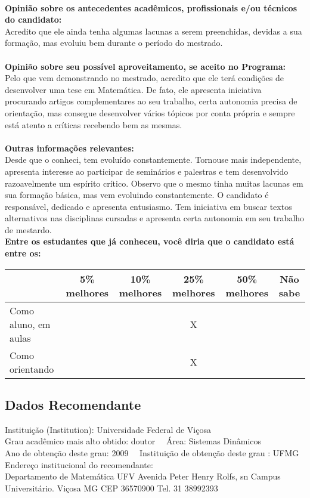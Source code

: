 \documentclass[11pt]{article}
\begin{document}
\\
\textbf{Opinião sobre os antecedentes acadêmicos, profissionais e/ou técnicos do candidato:}
\\Acredito que ele ainda tenha algumas lacunas a serem preenchidas, devidas a sua formação, mas evoluiu bem durante o período do mestrado.\\
\\
\textbf{Opinião sobre seu possível aproveitamento, se aceito no Programa:}
\\Pelo que vem demonstrando no mestrado, acredito que ele terá condições de desenvolver uma tese em Matemática. De fato, ele apresenta iniciativa procurando artigos complementares ao seu trabalho, certa autonomia precisa de orientação, mas consegue desenvolver vários tópicos por conta própria e sempre está atento a críticas recebendo bem as mesmas.\\ 
\\
\textbf{Outras informações relevantes:} \\Desde que o conheci, tem evoluído constantemente. Tornouse mais independente, apresenta interesse ao participar de seminários e palestras e tem desenvolvido razoavelmente um espírito crítico.  Observo que o mesmo tinha muitas lacunas em sua formação básica, mas vem evoluindo constantemente.
O candidato é responsável, dedicado e apresenta entusiasmo. Tem iniciativa em buscar textos alternativos nas disciplinas cursadas  e apresenta certa autonomia em seu trabalho de mestardo.
\\[0.3cm]
\textbf{Entre os estudantes que já conheceu, você diria que o candidato está entre os:}
\\
\begin{tabular}{|l|c|c|c|c|c|}
\hline
 & 5\% melhores & 10\% melhores & 25\% melhores & 50\% melhores & Não sabe \\
\hline
Como aluno, em aulas &  &  & X &  & \\
\hline
Como orientando &  &  & X &  & \\
\hline
\end{tabular}
\subsection*{Dados Recomendante} 
	Instituição (Institution): Universidade Federal de Viçosa
\\ 
	Grau acadêmico mais alto obtido: doutor
	\ \ Área: Sistemas Dinâmicos
	\\
	Ano de obtenção deste grau: 2009
	\ \ 
	Instituição de obtenção deste grau : UFMG
	\\ 
	Endereço institucional do recomendante: \\ Departamento de Matemática UFV 
Avenida Peter Henry Rolfs, sn
Campus Universitário. Viçosa  MG
CEP 36570900
Tel. 31 38992393
\end{document}
